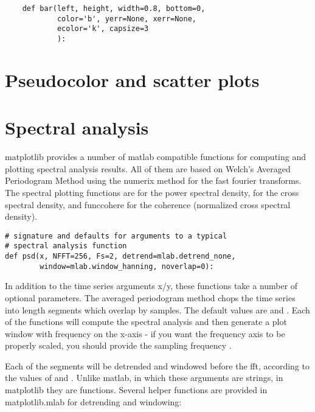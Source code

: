 \documentclass[twoside]{book}
\begin{document}
\begin{lstlisting}
    def bar(left, height, width=0.8, bottom=0,
            color='b', yerr=None, xerr=None, 
            ecolor='k', capsize=3
            ):
\end{lstlisting}



\section{Pseudocolor and scatter plots}
\label{sec:pcolor_scatter}

\section{Spectral analysis}
\label{sec:spectral}

matplotlib provides a number of matlab compatible functions for
computing and plotting spectral analysis results.  All of them are
based on Welch's Averaged Periodogram Method \citep{BendatPiersol1986}
using the numerix  method for the fast fourier transforms.
The spectral plotting functions are  for the power spectral
density,  for the cross spectral density, and func{cohere}
for the coherence (normalized cross spectral density).  

\begin{lstlisting}  
# signature and defaults for arguments to a typical
# spectral analysis function
def psd(x, NFFT=256, Fs=2, detrend=mlab.detrend_none, 
        window=mlab.window_hanning, noverlap=0):
\end{lstlisting}

In addition to the time series arguments x/y, these functions take a
number of optional parameters.  The averaged periodogram method chops
the time series into  length segments which overlap by
 samples.  The default values are  and
.  Each of the functions will compute the spectral
analysis and then generate a plot window with frequency on the x-axis
- if you want the frequency axis to be properly scaled, you should
provide the sampling frequency .

Each of the segments will be detrended and windowed before the fft,
according to the values of  and .  Unlike
matlab, in which these arguments are strings, in matplotlib they are
functions.  Several helper functions are provided in matplotlib.mlab
for detrending and windowing: 
\end{document}
